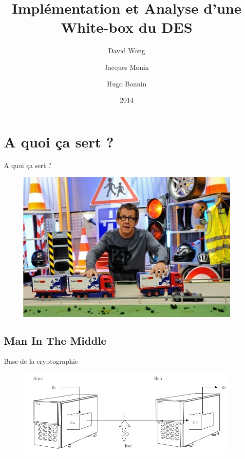\documentclass{beamer}
\author{David Wong
  \and Jacques Monin
  \and Hugo Bonnin}
\title{Implémentation et Analyse d'une White-box du DES}
\institute{Université de Bordeaux}
\date{2014}
\begin{document}
\begin{frame}
  \titlepage
\end{frame}



\section{A quoi ça sert ?}

\begin{frame}{A quoi ça sert ?}

\begin{figure}[h]
    \centering
    \includegraphics[scale=0.6]{./images/kezako.jpg}
  \end{figure}

\end{frame}

\subsection{Man In The Middle}

\begin{frame}{Base de la cryptographie}

  \begin{figure}[h]
    \centering
    \includegraphics[scale=0.50]{./images/alice_bob.png}
  \end{figure}

\end{frame}
\end{document}

